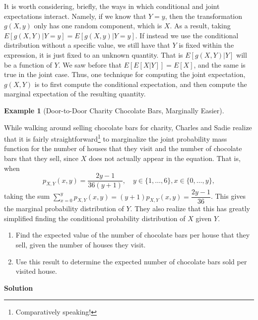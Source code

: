 \documentclass[
  letterpaper,
  DIV=11,
  numbers=noendperiod]{scrreprt}
\providecommand{\tightlist}{%
  \setlength{\itemsep}{0pt}\setlength{\parskip}{0pt}}\usepackage{longtable,booktabs,array}
\theoremstyle{definition}
\theoremstyle{definition}
\newtheorem{example}{Example}[chapter]
\theoremstyle{definition}
\theoremstyle{remark}
\begin{document}
It is worth considering, briefly, the ways in which conditional and
joint expectations interact. Namely, if we know that \(Y=y\), then the
transformation \(g(X,y)\) only has one random component, which is \(X\).
As a result, taking \(E[g(X,Y)|Y=y] = E[g(X,y)|Y=y]\). If instead we use
the conditional distribution without a specific value, we still have
that \(Y\) is fixed within the expression, it is just fixed to an
unknown quantity. That is \(E[g(X,Y)|Y]\) will be a function of \(Y\).
We saw before that \(E[E[X|Y]] = E[X]\), and the same is true in the
joint case. Thus, one technique for computing the joint expectation,
\(g(X,Y)\) is to first compute the conditional expectation, and then
compute the marginal expectation of the resulting quantity.

\begin{example}[Door-to-Door Charity Chocolate Bars, Marginally
Easier]\protect\hypertarget{exm-joint-expectation-two}{}\label{exm-joint-expectation-two}

While walking around selling chocolate bars for charity, Charles and
Sadie realize that it is fairly straightforward\footnote{Comparatively
  speaking!} to marginalize the joint probability mass function for the
number of houses that they visit and the number of chocolate bars that
they sell, since \(X\) does not actually appear in the equation. That
is, when
\[p_{X,Y}(x,y) = \frac{2y - 1}{36(y + 1)}, \quad y\in\{1,\dots,6\}, x\in\{0,\dots,y\},\]
taking the sum
\(\sum_{x=0}^{y} p_{X,Y}(x,y) = (y+1)p_{X,Y}(x,y) = \dfrac{2y-1}{36}\).
This gives the marginal probability distribution of \(Y\). They also
realize that this has greatly simplified finding the conditional
probability distribution of \(X\) given \(Y\).

\begin{enumerate}
\def\labelenumi{\alph{enumi}.}
\tightlist
\item
  Find the expected value of the number of chocolate bars per house that
  they sell, given the number of houses they visit.
\item
  Use this result to determine the expected number of chocolate bars
  sold per visited house.
\end{enumerate}

\begin{tcolorbox}[enhanced jigsaw, colback=white, colframe=quarto-callout-color-frame, arc=.35mm, leftrule=.75mm, rightrule=.15mm, opacityback=0, breakable, bottomrule=.15mm, left=2mm, toprule=.15mm]

\vspace{-3mm}\textbf{Solution}\vspace{3mm}


\end{tcolorbox}
\end{example}
\end{document}

